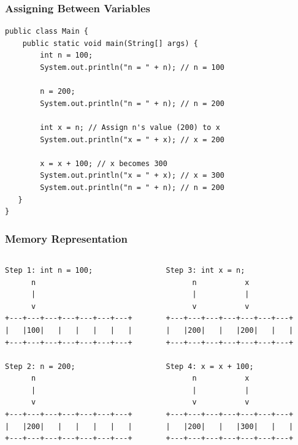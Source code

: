 \documentclass[serif, aspectratio=169]{beamer}
\begin{document}
\begin{frame}[fragile]
\frametitle{Assigning Between Variables}
\begin{lstlisting}
public class Main {
    public static void main(String[] args) {
        int n = 100;
        System.out.println("n = " + n); // n = 100

        n = 200;
        System.out.println("n = " + n); // n = 200

        int x = n; // Assign n's value (200) to x
        System.out.println("x = " + x); // x = 200

        x = x + 100; // x becomes 300
        System.out.println("x = " + x); // x = 300
        System.out.println("n = " + n); // n = 200
   }
}
\end{lstlisting}
\end{frame}

\begin{frame}[fragile]
\frametitle{Memory Representation}
    \vspace{-1.8em}
    \begin{columns}
    \begin{column}{0.5\textwidth}
\begin{verbatim}
Step 1: int n = 100;
      n
      |
      v
+---+---+---+---+---+---+---+
|   |100|   |   |   |   |   |
+---+---+---+---+---+---+---+

Step 2: n = 200;
      n
      |
      v
+---+---+---+---+---+---+---+
|   |200|   |   |   |   |   |
+---+---+---+---+---+---+---+
\end{verbatim}

    \end{column}
    \begin{column}{0.5\textwidth}
\begin{verbatim}
Step 3: int x = n;
      n           x
      |           |
      v           v
+---+---+---+---+---+---+---+
|   |200|   |   |200|   |   |
+---+---+---+---+---+---+---+

Step 4: x = x + 100;
      n           x
      |           |
      v           v
+---+---+---+---+---+---+---+
|   |200|   |   |300|   |   |
+---+---+---+---+---+---+---+
\end{verbatim}
    \end{column}
    \end{columns}
\end{frame}
\end{document}
